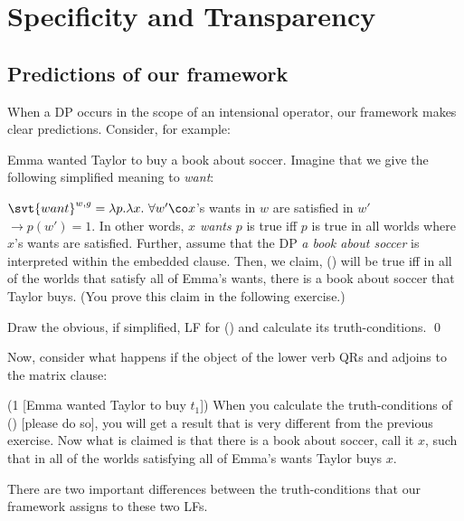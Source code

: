 \chapter{Specificity and Transparency}

\minitoc

\section{Predictions of our framework}
\label{sec:predictions}

When a DP occurs in the scope of an intensional operator, our framework makes
clear predictions. Consider, for example:

\ex
Emma wanted Taylor to buy a book about soccer.
\xe
%
%
Imagine that we give the following simplified meaning to \emph{want}:

\ex $\svt{want}^{w,g} = \lambda p.\lambda x.\ \forall w'\co x$'s wants in $w$
are satisfied in $w'$\\\hfill$\rightarrow p(w')=1$. \xe
%
In other words, \emph{$x$ wants $p$} is true iff $p$ is true in all worlds where
$x$'s wants are satisfied. Further, assume that the DP \emph{a book about
  soccer} is interpreted within the embedded clause. Then, we claim, (\blastx)
will be true iff in all of the worlds that satisfy all of Emma's wants, there is
a book about soccer that Taylor buys. (You prove this claim in the following
exercise.)

\begin{exercise}
  Draw the obvious, if simplified, LF for (\blastx) and calculate its
  truth-conditions. \qed
\end{exercise}
%
Now, consider what happens if the object of the lower verb QRs and adjoins to
the matrix clause:

\ex{} (1 [Emma wanted Taylor to buy $t_1$])
\xe
%
When you calculate the truth-conditions of (\lastx) [please do so], you will get
a result that is very different from the previous exercise. Now what is claimed
is that there is a book about soccer, call it $x$, such that in all of the
worlds satisfying all of Emma's wants Taylor buys $x$.

There are two important differences between the truth-conditions that our
framework assigns to these two LFs.

